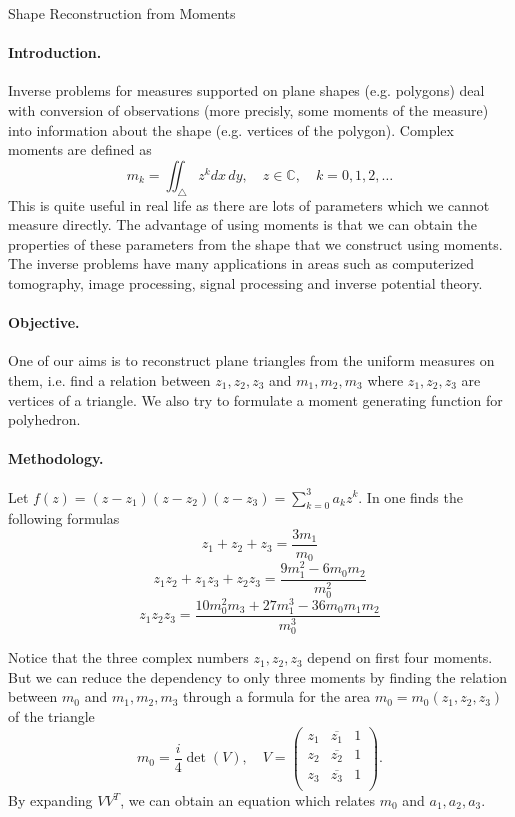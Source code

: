 \documentclass[twocolumn]{article}
\newcommand{\sect}[1]{\vspace{-1mm} \paragraph{{\large {#1}.}}}
\begin{document}
\thispagestyle{empty}

\begin{huge}
\begin{center}
Shape Reconstruction from Moments
\end{center}
\end{huge}

\begin{large}

\sect{Introduction}
Inverse problems for measures supported on plane shapes (e.g. polygons) deal
with conversion of observations (more precisly, some moments of the
measure) into information about the shape (e.g. vertices of the polygon).
Complex moments are defined as 
$$m_k = \iint_\triangle{z^k}dx\,dy, \quad z\in \mathbb{C}, \quad k=0,1,2,\dots$$ 
This is quite useful in real life as there are lots of parameters which we
cannot measure directly. The advantage of using moments is that we can obtain
the properties of these parameters from the shape that we construct using
moments. The inverse problems have many applications in areas such as
computerized tomography, image processing, signal processing and inverse
potential theory. 

\sect{Objective}
One of our aims is to reconstruct plane triangles from the uniform measures on them, 
i.e. find a relation between
$z_1,z_2,z_3$ and $m_1,m_2,m_3$ where $z_1,z_2,z_3$ are vertices of a triangle.
We also try to formulate a moment generating function for polyhedron.

\sect{Methodology}
Let $f(z)=(z-z_1)(z-z_2)(z-z_3)=\sum_{k=0}^{3}{a_kz^k}$.
In \cite{davis77} one finds the following formulas
$$z_1+z_2+z_3=\frac{3m_1}{m_0}$$ $$z_1z_2+z_1z_3+z_2z_3=\frac{9m_1^2 -6m_0m_2}{m_0^2}$$ $$z_1z_2z_3=\dfrac{10m_0^2m_3+27m_1^3-36m_0m_1m_2}
{m_0^3}$$

Notice that the three complex numbers $z_1,z_2,z_3$ depend on first four
moments. But we can reduce the dependency to only three moments by finding the
relation between $m_0$ and $m_1,m_2,m_3$ through a formula for the area 
$m_0=m_0(z_1,z_2,z_3)$ of the triangle  
$$m_0=\frac{i}{4}\det(V), \quad V=
\begin{pmatrix}
z_1 & \overline{z_1} & 1 \\
z_2 & \overline{z_2} & 1 \\
z_3 & \overline{z_3} & 1 \\
\end{pmatrix}.$$
By expanding $VV^T$, we can obtain an equation which relates $m_0$ and $a_1,a_2,a_3$.


\end{large}
\end{document}
